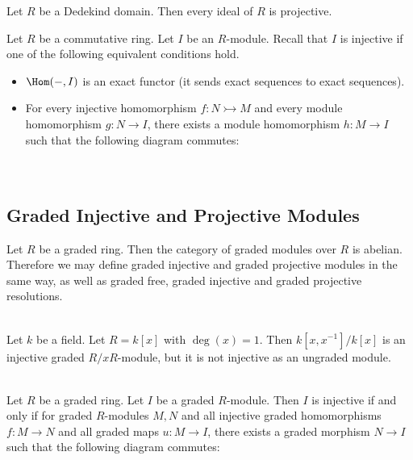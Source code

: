 \documentclass[a4paper]{article}
\begin{document}
\begin{prp}{}{} Let $R$ be a Dedekind domain. Then every ideal of $R$ is projective. 
\end{prp}

Let $R$ be a commutative ring. Let $I$ be an $R$-module. Recall that $I$ is injective if one of the following equivalent conditions hold. 
\begin{itemize}
\item $\Hom(-,I)$ is an exact functor (it sends exact sequences to exact sequences). 
\item For every injective homomorphism $f:N\rightarrowtail M$ and every module homomorphism $g:N\to I$, there exists a module homomorphism $h:M\to I$ such that the following diagram commutes: \\~\\
 \\
\end{itemize}

\subsection{Graded Injective and Projective Modules}
Let $R$ be a graded ring. Then the category of graded modules over $R$ is abelian. Therefore we may define graded injective and graded projective modules in the same way, as well as graded free, graded injective and graded projective resolutions. 

\begin{eg}{}{}\\
Let $k$ be a field. Let $R=k[x]$ with $\deg(x)=1$. Then $k[x,x^{-1}]/k[x]$ is an injective graded $R/xR$-module, but it is not injective as an ungraded module. 
\end{eg}

\begin{prp}{}{}\\
Let $R$ be a graded ring. Let $I$ be a graded $R$-module. Then $I$ is injective if and only if for graded $R$-modules $M,N$ and all injective graded homomorphisms $f:M\to N$ and all graded maps $u:M\to I$, there exists a graded morphism $N\to I$ such that the following diagram commutes: \\
\\
\end{prp}
\end{document}
